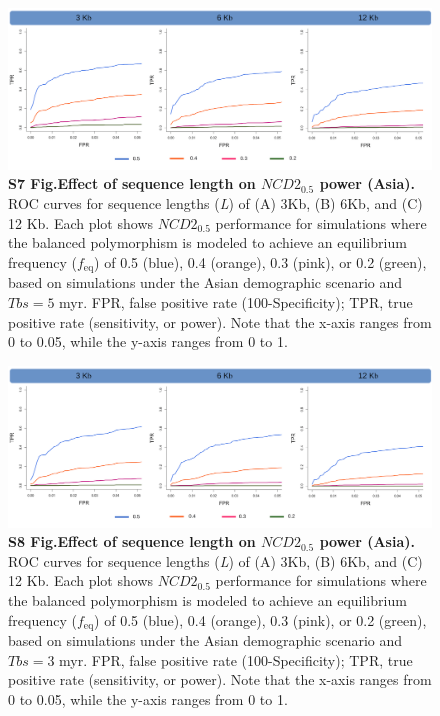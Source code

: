 \begin{refsection}
\begin{otherlanguage}{english}
\begin{figure}
\includegraphics[]{chap2_folder/supp_figures/S7_Fig.png}
\caption*{\textbf{S7 Fig.Effect of sequence length on $NCD2_{0.5}$ power (Asia). }\\
ROC curves for sequence lengths (\emph{L}) of (A) 3Kb, (B) 6Kb, and (C) 12 Kb. Each plot shows $NCD2_{0.5}$ performance for simulations where the balanced polymorphism is modeled to achieve an equilibrium frequency ($f_{\mathrm{eq}}$) of 0.5 (blue), 0.4 (orange), 0.3 (pink), or 0.2 (green), based on simulations under the Asian demographic scenario and $Tbs = 5$ myr. FPR, false positive rate (100-Specificity); TPR, true positive rate (sensitivity, or power). Note that the x-axis ranges from 0 to 0.05, while the y-axis ranges from 0 to 1.}
\end{figure}
%
\begin{figure}
\includegraphics[]{chap2_folder/supp_figures/S8_Fig.png}
\caption*{\textbf{S8 Fig.Effect of sequence length on $NCD2_{0.5}$ power (Asia). }\\
ROC curves for sequence lengths (\emph{L}) of (A) 3Kb, (B) 6Kb, and (C) 12 Kb. Each plot shows $NCD2_{0.5}$ performance for simulations where the balanced polymorphism is modeled to achieve an equilibrium frequency ($f_{\mathrm{eq}}$) of 0.5 (blue), 0.4 (orange), 0.3 (pink), or 0.2 (green), based on simulations under the Asian demographic scenario and $Tbs = 3$ myr. FPR, false positive rate (100-Specificity); TPR, true positive rate (sensitivity, or power). Note that the x-axis ranges from 0 to 0.05, while the y-axis ranges from 0 to 1.}

\end{figure}
\end{otherlanguage}
\end{refsection}
